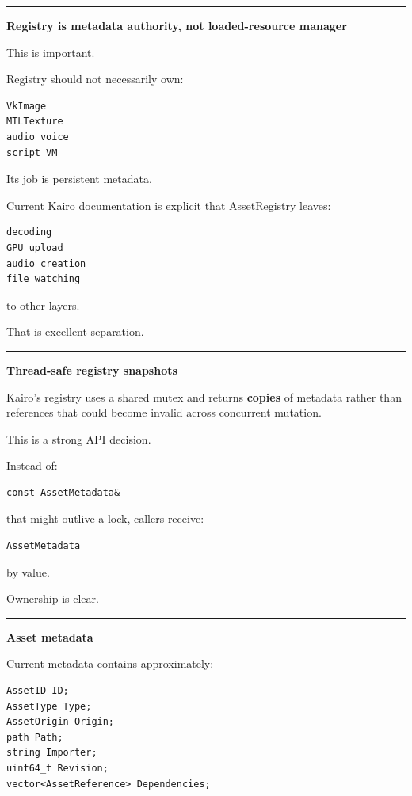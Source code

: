 \begin{center}\rule{0.5\linewidth}{0.5pt}\end{center}

\textbf{Registry is metadata authority, not loaded-resource manager}

This is important.

Registry should not necessarily own:

\begin{verbatim}
VkImage
MTLTexture
audio voice
script VM
\end{verbatim}

Its job is persistent metadata.

Current Kairo documentation is explicit that AssetRegistry leaves:

\begin{verbatim}
decoding
GPU upload
audio creation
file watching
\end{verbatim}

to other layers.

That is excellent separation.

\begin{center}\rule{0.5\linewidth}{0.5pt}\end{center}

\textbf{Thread-safe registry snapshots}

Kairo's registry uses a shared mutex and returns \textbf{copies} of metadata rather than references that could become invalid across concurrent mutation.

This is a strong API decision.

Instead of:

\begin{verbatim}
const AssetMetadata&
\end{verbatim}

that might outlive a lock, callers receive:

\begin{verbatim}
AssetMetadata
\end{verbatim}

by value.

Ownership is clear.

\begin{center}\rule{0.5\linewidth}{0.5pt}\end{center}

\textbf{Asset metadata}

Current metadata contains approximately:

\begin{verbatim}
AssetID ID;
AssetType Type;
AssetOrigin Origin;
path Path;
string Importer;
uint64_t Revision;
vector<AssetReference> Dependencies;
\end{verbatim}

